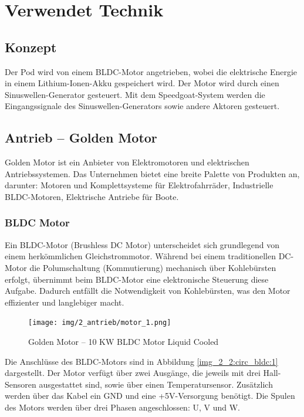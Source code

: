 \chapter{Verwendet Technik}

\section{Konzept}
Der Pod wird von einem BLDC-Motor angetrieben, wobei die elektrische Energie in einem Lithium-Ionen-Akku gespeichert wird. Der Motor wird durch einen Sinuswellen-Generator gesteuert. Mit dem Speedgoat-System werden die Eingangssignale des Sinuswellen-Generators sowie andere Aktoren gesteuert.

\section{Antrieb – Golden Motor}
\label{Golden_Motor}
Golden Motor ist ein Anbieter von Elektromotoren und elektrischen Antriebssystemen. Das Unternehmen bietet eine breite Palette von Produkten an, darunter:
Motoren und Komplettsysteme für Elektrofahrräder, Industrielle BLDC-Motoren, Elektrische Antriebe für Boote.


\subsection{BLDC Motor}
\label{BLDC_Motor}


Ein BLDC-Motor (Brushless DC Motor) unterscheidet sich grundlegend von einem herkömmlichen Gleichstrommotor. Während bei einem traditionellen DC-Motor die Polumschaltung (Kommutierung) mechanisch über Kohlebürsten erfolgt, übernimmt beim BLDC-Motor eine elektronische Steuerung diese Aufgabe. Dadurch entfällt die Notwendigkeit von Kohlebürsten, was den Motor effizienter und langlebiger macht\cite{mathworks:bldc_motor}.

\begin{figure}[ht]
	\begin{center}
		\texttt{[image: img/2\_antrieb/motor\_1.png]}
		\caption{Golden Motor – 10 KW BLDC Motor Liquid Cooled}
		\label{img_2_2:antrieb_motor:1}
	\end{center}
\end{figure}
\pagebreak[4]


Die Anschlüsse des BLDC-Motors sind in Abbildung \ref{img_2_2:circ_bldc:1} dargestellt. Der Motor verfügt über zwei Ausgänge, die jeweils mit drei Hall-Sensoren ausgestattet sind, sowie über einen Temperatursensor. Zusätzlich werden über das Kabel ein GND und eine +5V-Versorgung benötigt. Die Spulen des Motors werden über drei Phasen angeschlossen: U, V und W.

